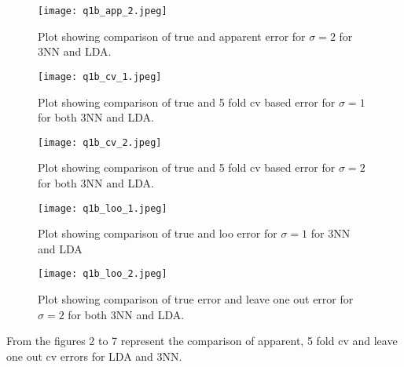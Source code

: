 \documentclass[paper=a4, fontsize=11pt]{scrartcl} %
\begin{document}
\begin{center}
\begin{figure}[H]
\hspace{2 cm}
\texttt{[image: q1b\_app\_2.jpeg]} 
\caption{Plot showing comparison of true and apparent error for $\sigma=2$ for 3NN and LDA.}
\end{figure}
\end{center}

\begin{center}
\begin{figure}[H]
\hspace{2 cm}
\texttt{[image: q1b\_cv\_1.jpeg]} 
\caption{Plot showing comparison of true and 5 fold cv based error for $\sigma=1$ for both 3NN and LDA.}
\end{figure}
\end{center}
\newpage

\begin{center}
\begin{figure}[H]
\hspace{2 cm}
\texttt{[image: q1b\_cv\_2.jpeg]} 
\caption{Plot showing comparison of true and 5 fold cv based error for $\sigma=2$ for both 3NN and LDA.}

\end{figure}
\end{center}

\begin{center}
\begin{figure}[H]
\hspace{2 cm}
\texttt{[image: q1b\_loo\_1.jpeg]} 
\caption{Plot showing comparison of true and loo error for $\sigma=1$ for 3NN and LDA}

\end{figure}
\end{center}
\newpage

\begin{center}
\begin{figure}[H]
\hspace{2 cm}
\texttt{[image: q1b\_loo\_2.jpeg]} 
\caption{Plot showing comparison of true error and leave one out error for $\sigma=2$ for both 3NN and LDA.}

\end{figure}
\end{center}


From the figures 2 to 7 represent the comparison of apparent, 5 fold cv and leave one out cv errors for LDA and 3NN. \newline
\end{document}
